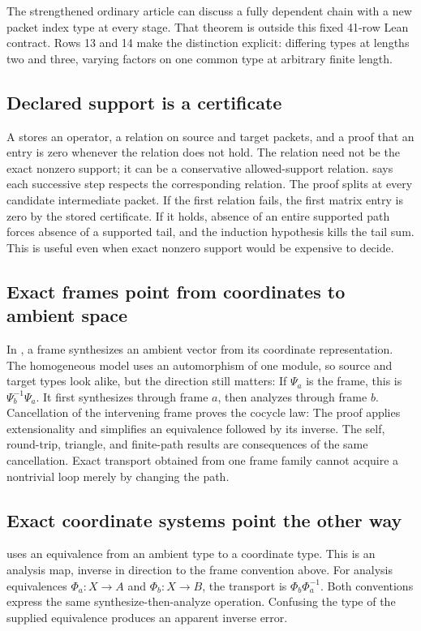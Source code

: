 The strengthened ordinary article can discuss a fully dependent chain with a new packet index type at every stage. That theorem is outside this fixed 41-row Lean contract. Rows 13 and 14 make the distinction explicit: differing types at lengths two and three, varying factors on one common type at arbitrary finite length.

\subsection{Declared support is a certificate}
A  stores an operator, a relation on source and target packets, and a proof that an entry is zero whenever the relation does not hold. The relation need not be the exact nonzero support; it can be a conservative allowed-support relation.  says each successive step respects the corresponding relation.
The proof splits at every candidate intermediate packet. If the first relation fails, the first matrix entry is zero by the stored certificate. If it holds, absence of an entire supported path forces absence of a supported tail, and the induction hypothesis kills the tail sum. This is useful even when exact nonzero support would be expensive to decide.

\subsection{Exact frames point from coordinates to ambient space}
In , a frame synthesizes an ambient vector from its coordinate representation. The homogeneous model uses an automorphism of one module, so source and target types look alike, but the direction still matters:
If $\Psi_a$ is the frame, this is $\Psi_b^{-1}\Psi_a$. It first synthesizes through frame $a$, then analyzes through frame $b$. Cancellation of the intervening frame proves the cocycle law:
The proof applies extensionality and simplifies an equivalence followed by its inverse. The self, round-trip, triangle, and finite-path results are consequences of the same cancellation. Exact transport obtained from one frame family cannot acquire a nontrivial loop merely by changing the path.

\subsection{Exact coordinate systems point the other way}
 uses an equivalence  from an ambient type to a coordinate type. This is an analysis map, inverse in direction to the frame convention above.
For analysis equivalences $\Phi_a:X\to A$ and $\Phi_b:X\to B$, the transport is $\Phi_b\Phi_a^{-1}$. Both conventions express the same synthesize-then-analyze operation. Confusing the type of the supplied equivalence produces an apparent inverse error.

